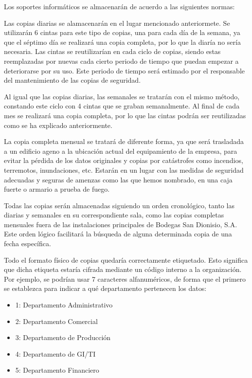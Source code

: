 \documentclass[a4paper,11pt,bibtotoc,noliststotoc]{scrbook}
\begin{document}
\begin{itemize}
Los soportes informáticos se almacenarán de acuerdo a las siguientes normas:

Las copias diarias se alamacenarán en el lugar mencionado anteriormete. Se utilizarán 6 cintas para este tipo de copias, una para cada día de la semana, ya que el séptimo día se realizará una copia completa, por lo que la diaría no sería necesaria. Las cintas se reutilizarían en cada ciclo de copias, siendo estas reemplazadas por nuevas cada cierto periodo de tiempo que puedan empezar a deteriorarse por su uso. Este periodo de tiempo será estimado por el responsable del mantenimiento de las copias de seguridad.

Al igual que las copias diarias, las semanales se tratarán con el mismo método, constando este ciclo con 4 cintas que se graban semanalmente. Al final de cada mes se realizará una copia completa, por lo que las cintas podrán ser reutilizadas como se ha explicado anteriormente.

La copia completa mensual se tratará de diferente forma, ya que será trasladada a un edificio ageno a la ubicación actual del equipamiento de la empresa, para evitar la pérdida de los datos originales y copias por catástrofes como incendios, terremotos, inundaciones, etc. Estarán en un lugar con las medidas de seguridad adecuadas y seguras de amenzas como las que hemos nombrado, en una caja fuerte o armario a prueba de fuego.

Todas las copias serán almacenadas siguiendo un orden cronológico, tanto las diarias y semanales en su correspondiente sala, como las copias completas mensuales fuera de las instalaciones principales de Bodegas San Dionisio, S.A. Este orden lógico facilitará la búsqueda de alguna determinada copia de una fecha específica.

Todo el formato físico de copias quedaría correctamente etiquetado. Esto significa que dicha etiqueta estaría cifrada mediante un código interno a la organización. Por ejemplo, se podrían usar 7 caracteres alfanuméricos, de forma que el primero se establezca para indicar a qué departamento pertenecen los datos:

\begin{itemize}
\item 1: Departamento Administrativo 
\item 2: Departamento Comercial
\item 3: Departamento de Producción
\item 4: Departamento de GI/TI
\item 5: Departamento Financiero
\end{itemize}


\end{itemize}
\end{document}
